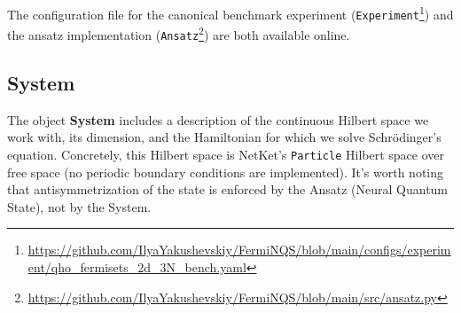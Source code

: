 \documentclass[a4paper,11pt,twoside]{article}
\begin{document}
The configuration file for the canonical benchmark experiment (\texttt{Experiment}\footnote{\url{https://github.com/IlyaYakushevskiy/FermiNQS/blob/main/configs/experiment/qho_fermisets_2d_3N_bench.yaml}}) and the ansatz implementation (\texttt{Ansatz}\footnote{\url{https://github.com/IlyaYakushevskiy/FermiNQS/blob/main/src/ansatz.py}}) are both available online.




\subsection{System}
\label{impl:sys}

The object \textbf{System} includes a description of the continuous Hilbert space we work with, its dimension, and the Hamiltonian for which we solve Schrödinger's equation. Concretely, this Hilbert space is NetKet's \texttt{Particle} Hilbert space over free space (no periodic boundary conditions are implemented). It's worth noting that antisymmetrization of the state is enforced by the Ansatz (Neural Quantum State), not by the System.
\end{document}
